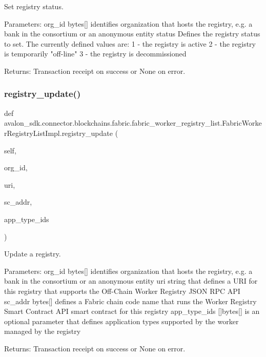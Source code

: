 \begin{DoxyVerb}Set registry status.

Parameters:
org_id  bytes[] identifies organization that hosts the
registry, e.g. a bank in the consortium or an
anonymous entity
status  Defines the registry status to set.
The currently defined values are:
1 - the registry is active
2 - the registry is temporarily "off-line"
3 - the registry is decommissioned

Returns:
Transaction receipt on success or None on error.
\end{DoxyVerb}
 \mbox{\label{classavalon__sdk_1_1connector_1_1blockchains_1_1fabric_1_1fabric__worker__registry__list_1_1FabricWorkerRegistryListImpl_a1169f977e01dcaa0875a2152a14a5ec7}} 
\subsubsection{\texorpdfstring{registry\+\_\+update()}{registry\_update()}}
{\footnotesize\ttfamily def avalon\+\_\+sdk.\+connector.\+blockchains.\+fabric.\+fabric\+\_\+worker\+\_\+registry\+\_\+list.\+Fabric\+Worker\+Registry\+List\+Impl.\+registry\+\_\+update (\begin{DoxyParamCaption}\item[{}]{self,  }\item[{}]{org\+\_\+id,  }\item[{}]{uri,  }\item[{}]{sc\+\_\+addr,  }\item[{}]{app\+\_\+type\+\_\+ids }\end{DoxyParamCaption})}

\begin{DoxyVerb}Update a registry.

Parameters:
org_id       bytes[] identifies organization that hosts the
     registry, e.g. a bank in the consortium or an
     anonymous entity
uri          string that defines a URI for this registry that
     supports the Off-Chain Worker Registry
     JSON RPC API
sc_addr      bytes[] defines a Fabric chain code name that
     runs the Worker Registry Smart Contract API
     smart contract for this registry
app_type_ids []bytes[] is an optional parameter that defines
     application types supported by the worker
     managed by the registry

Returns:
Transaction receipt on success or None on error.
\end{DoxyVerb}
 

